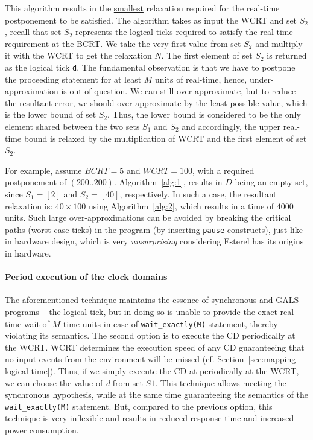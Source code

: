 This algorithm results in the \underline{smallest} relaxation required
for the real-time postponement to be satisfied. The algorithm takes as
input the WCRT and set $S_2$, recall that set $S_2$ represents the
logical ticks required to satisfy the real-time requirement at the
BCRT. We take the very first value from set $S_2$ and multiply it with
the WCRT to get the relaxation $N$. The first element of set $S_2$ is
returned as the logical tick \texttt{d}. The fundamental observation is
that we have to postpone the proceeding statement for at least $M$ units
of real-time, hence, under-approximation is out of question. We can
still over-approximate, but to reduce the resultant error, we should
over-approximate by the least possible value, which is the lower bound
of set $S_2$. Thus, the lower bound is considered to be the only element
shared between the two sets $S_1$ and $S_2$ and accordingly, the upper
real-time bound is relaxed by the multiplication of WCRT and the first
element of set $S_2$.

For example, assume $BCRT=5$ and $WCRT=100$, with a required
postponement of $(200..200)$. Algorithm~\ref{alg:1}, results in $D$
being an empty set, since $S_1=[2]$ and $S_2=[40]$, respectively. In
such a case, the resultant relaxation is: $40 \times 100$ using
Algorithm~\ref{alg:2}, which results in a time of $4000$ units. Such
large over-approximations can be avoided by breaking the critical paths
(worst case ticks) in the program (by inserting \texttt{pause}
constructs), just like in hardware design, which is very
\textit{unsurprising} considering Esterel has its origins in hardware.

\paragraph{Period execution of the clock domains}
\label{sec:peri-exec-clock}

The aforementioned technique maintains the essence of synchronous and
GALS programs -- the logical tick, but in doing so is unable to provide
the exact real-time wait of $M$ time units in case of
\texttt{wait\_exactly(M)} statement, thereby violating its
semantics. The second option is to execute the CD periodically at the
WCRT. WCRT determines the execution speed of any CD guaranteeing that no
input events from the environment will be missed
(cf. Section~\ref{sec:mapping-logical-time}). Thus, if we simply execute
the CD at periodically at the WCRT, we can choose the value of
\textit{d} from set $S1$. This technique allows meeting the synchronous
hypothesis, while at the same time guaranteeing the semantics of the
\texttt{wait\_exactly(M)} statement. But, compared to the previous
option, this technique is very inflexible and results in reduced
response time and increased power consumption.

